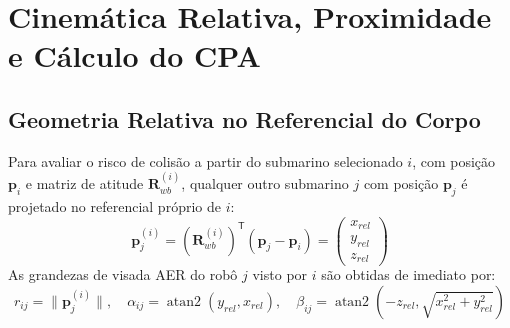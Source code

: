 \documentclass[11pt,a4paper]{article}
\newcommand{\vv}[1]{\mathbf{#1}}
\newcommand{\Rot}{\mathbf{R}}
\newcommand{\T}{^{\mathsf{T}}}
\theoremstyle{definition}
\begin{document}
\section{Cinemática Relativa, Proximidade e Cálculo do CPA}

\subsection{Geometria Relativa no Referencial do Corpo}
Para avaliar o risco de colisão a partir do submarino selecionado $i$, com posição $\vv{p}_i$ e matriz de atitude $\Rot_{wb}^{(i)}$, qualquer outro submarino $j$ com posição $\vv{p}_j$ é projetado no referencial próprio de $i$:
\begin{equation}
    \vv{p}_j^{(i)} = (\Rot_{wb}^{(i)})\T (\vv{p}_j - \vv{p}_i) = \begin{pmatrix} x_{rel} \\ y_{rel} \\ z_{rel} \end{pmatrix}
\end{equation}
As grandezas de visada AER do robô $j$ visto por $i$ são obtidas de imediato por:
\begin{equation}
    r_{ij} = \|\vv{p}_j^{(i)}\|, \quad \alpha_{ij} = \operatorname{atan2}(y_{rel}, x_{rel}), \quad \beta_{ij} = \operatorname{atan2}(-z_{rel}, \sqrt{x_{rel}^2 + y_{rel}^2})
\end{equation}
\end{document}
